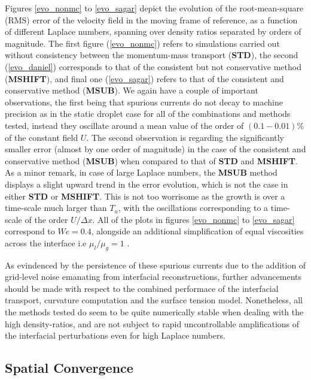 Figures \ref{evo_nonmc} to \ref{evo_sagar} depict the evolution of the root-mean-square (RMS) error of the velocity field in the moving frame of reference, as a function of different Laplace numbers, spanning over density ratios separated by orders of magnitude. The first figure (\ref{evo_nonmc}) refers to simulations carried out without consistency between the momentum-mass transport (\textbf{STD}), the second (\ref{evo_daniel}) corresponds to that of the consistent but not conservative method (\textbf{MSHIFT}), and final one (\ref{evo_sagar}) refers to that of the consistent and conservative method (\textbf{MSUB}). We again have a couple of important observations, the first being that spurious currents do not decay to machine precision as in the static droplet case for all of the combinations and methods tested, instead they oscillate around a mean value of the order of $(0.1-0.01)\% $ of the constant field $U$. The second observation is regarding the significantly smaller error (almost by one order of magnitude) in the case of the consistent and conservative method (\textbf{MSUB}) when compared to that of \textbf{STD} and \textbf{MSHIFT}. As a minor remark, in case of large Laplace numbers, the \textbf{MSUB} method displays a slight upward trend in the error evolution, which is not the case in either \textbf{STD} or \textbf{MSHIFT}. This is not too worrisome as the growth is over a time-scale much larger than $T_u$, with the oscillations corresponding to a time-scale of the order $U/\Delta x$. All of the plots in figures \ref{evo_nonmc} to \ref{evo_sagar} correspond to $We = 0.4$, alongside an additional simplification of equal viscosities across the interface i.e $\mu_l/\mu_g = 1$ .

As evindenced by the persistence of these spurious currents due to the addition of grid-level noise emanating from interfacial reconstructions, further advancements should be made with respect to the combined performace of the interfacial transport, curvature computation and the surface tension model. Nonetheless, all the methods tested do seem to be quite numerically stable when dealing with the high density-ratios, and are not subject to rapid uncontrollable amplifications of the interfacial perturbations even for high Laplace numbers.

\subsection*{Spatial Convergence}

